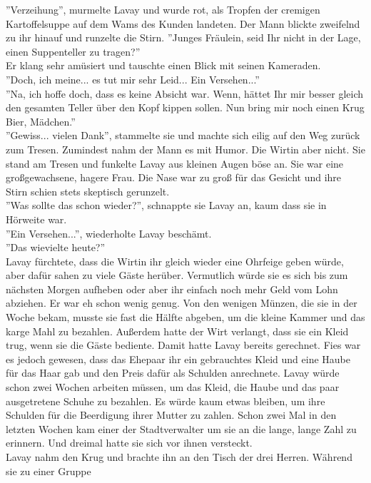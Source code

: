 ''Verzeihung”, murmelte Lavay und wurde rot, als Tropfen der cremigen Kartoffelsuppe auf dem 
Wams des Kunden landeten. Der Mann blickte zweifelnd zu ihr hinauf und runzelte die Stirn.
''Junges Fräulein, seid Ihr nicht in der Lage, einen  Suppenteller zu tragen?”\\
Er klang sehr amüsiert und tauschte einen Blick mit seinen Kameraden.\\
''Doch, ich meine... es tut mir sehr Leid... Ein Versehen...”\\
''Na, ich hoffe doch, dass es keine Absicht war. Wenn, hättet Ihr mir besser gleich den gesamten 
Teller über den Kopf kippen sollen. Nun bring mir noch einen Krug Bier, Mädchen.”\\
''Gewiss... vielen Dank”, stammelte sie und machte sich eilig auf den Weg zurück zum Tresen. 
Zumindest nahm der Mann es mit Humor. Die Wirtin aber nicht. Sie stand am Tresen und funkelte Lavay 
aus kleinen Augen böse an. Sie war eine großgewachsene, hagere Frau. Die Nase war zu groß für das 
Gesicht und ihre Stirn schien stets skeptisch gerunzelt.\\
''Was sollte das schon wieder?”, schnappte sie Lavay an, kaum dass sie in Hörweite war.\\
''Ein Versehen...”, wiederholte Lavay beschämt.\\
''Das wievielte heute?”\\
Lavay fürchtete, dass die Wirtin ihr gleich wieder eine Ohrfeige geben würde, aber dafür sahen zu 
viele Gäste herüber. Vermutlich würde sie es sich bis zum nächsten Morgen aufheben oder aber ihr 
einfach noch mehr Geld vom Lohn abziehen. Er war eh schon wenig genug. Von den wenigen 
Münzen, die sie in der Woche bekam, musste sie fast die Hälfte abgeben, um die kleine Kammer und 
das karge Mahl zu bezahlen. Außerdem hatte der Wirt verlangt, dass sie ein Kleid trug, wenn sie die 
Gäste bediente. Damit hatte Lavay bereits gerechnet. Fies war es jedoch gewesen, dass das Ehepaar 
ihr ein gebrauchtes Kleid und eine Haube für das Haar gab und den Preis dafür als Schulden 
anrechnete. Lavay würde schon zwei Wochen arbeiten müssen, um das Kleid, die Haube und das paar 
ausgetretene Schuhe zu bezahlen. Es würde kaum etwas bleiben, um ihre Schulden für die Beerdigung 
ihrer Mutter zu zahlen. Schon zwei Mal in den letzten Wochen kam einer der Stadtverwalter um sie an 
die lange, lange Zahl zu erinnern. Und dreimal hatte sie sich vor ihnen versteckt.\\
Lavay nahm den Krug und brachte ihn an den Tisch der drei Herren. Während sie zu einer Gruppe 
